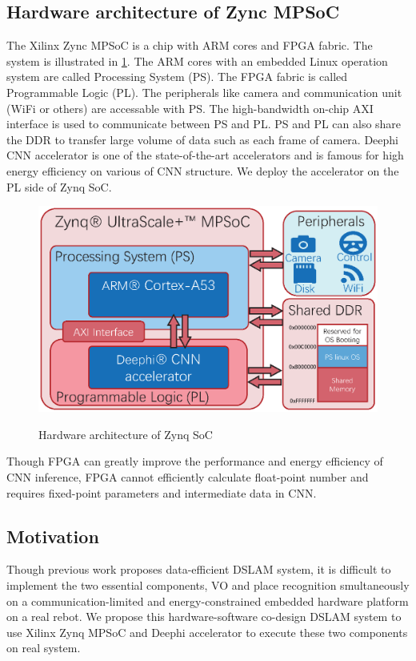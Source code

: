\subsection{Hardware architecture of Zync MPSoC}
The Xilinx Zync MPSoC is a chip with ARM cores and FPGA fabric. The system is illustrated in \cref{fig:plps}. The ARM cores with an embedded Linux operation system are called Processing System (PS). The FPGA fabric is called Programmable Logic (PL). The peripherals like camera and communication unit (WiFi or others) are accessable with PS. The high-bandwidth on-chip AXI interface is used to communicate between PS and PL. PS and PL can also share the DDR to transfer large volume of data such as each frame of camera.
Deephi CNN accelerator \cite{Tech:2019360} is one of the state-of-the-art accelerators and is famous for high energy efficiency on various of CNN structure. We deploy the accelerator on the PL side of Zynq SoC.

\begin{figure}[t]  
    \centering  
    {\includegraphics[width=0.95\linewidth]{fig/plps.eps}\label{fig:plps}} 
    \caption{Hardware architecture of Zynq SoC}
\end{figure}

Though FPGA can greatly improve the performance and energy efficiency of CNN inference, FPGA cannot efficiently calculate float-point number and requires fixed-point parameters and intermediate data in CNN.

\subsection{Motivation}
Though previous work \cite{Cieslewski:20187ee} proposes data-efficient DSLAM system, it is difficult to implement the two essential components, VO and place recognition smultaneously on a communication-limited and energy-constrained embedded hardware platform on a real rebot. We propose this hardware-software co-design DSLAM system to use Xilinx Zynq MPSoC and Deephi accelerator to execute these two components on real system.

